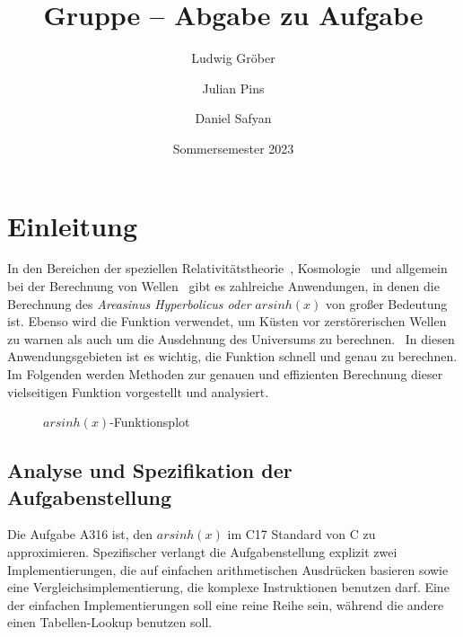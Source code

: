 \documentclass[course=erap] {aspdoc}
\author{Ludwig Gröber \and Julian Pins \and Daniel Safyan}
\date{Sommersemester 2023} %
\title{Gruppe \theGroup{} -- Abgabe zu Aufgabe \theNumber}
\begin{document}
    \maketitle


    \section{Einleitung}\label{sec:einleitung}

    In den Bereichen der speziellen Relativitätstheorie~\cite{relativity}, Kosmologie~\cite{universum1,universum2} und allgemein bei der Berechnung von Wellen~\cite{linear_waves} gibt es zahlreiche Anwendungen, in denen die Berechnung des \textit{Areasinus Hyperbolicus oder} $arsinh(x)$ von großer Bedeutung ist.
    Ebenso wird die Funktion verwendet, um Küsten vor zerstörerischen Wellen zu warnen als auch um die Ausdehnung des Universums zu berechnen.~\cite{universum1,universum2}
    In diesen Anwendungsgebieten ist es wichtig, die Funktion schnell und genau zu berechnen.
    Im Folgenden werden Methoden zur genauen und effizienten Berechnung dieser vielseitigen Funktion vorgestellt und analysiert.
    \begin{figure}[h]
        \caption{$arsinh(x)$-Funktionsplot}
    \end{figure}

    \subsection{Analyse und Spezifikation der Aufgabenstellung}\label{subsec:analyse-und-spezifikation-der-aufgabenstellung}

    Die Aufgabe A316 ist, den $arsinh(x)$ im C17 Standard von C zu approximieren.
    Spezifischer verlangt die Aufgabenstellung explizit zwei Implementierungen, die auf einfachen arithmetischen Ausdrücken basieren sowie eine Vergleichsimplementierung, die komplexe Instruktionen benutzen darf.
    Eine der einfachen Implementierungen soll eine reine Reihe sein, während die andere einen Tabellen-Lookup benutzen soll.
\end{document}
